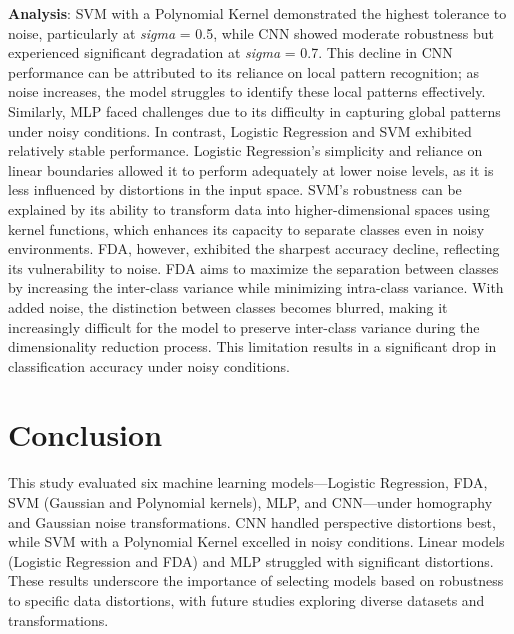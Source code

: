 \documentclass{article}
\begin{document}
\textbf{Analysis}:  
SVM with a Polynomial Kernel demonstrated the highest tolerance to noise, particularly at \textit{sigma} = 0.5, while CNN showed moderate robustness but experienced significant degradation at \textit{sigma} = 0.7. This decline in CNN performance can be attributed to its reliance on local pattern recognition; as noise increases, the model struggles to identify these local patterns effectively. Similarly, MLP faced challenges due to its difficulty in capturing global patterns under noisy conditions. 
In contrast, Logistic Regression and SVM exhibited relatively stable performance. Logistic Regression's simplicity and reliance on linear boundaries allowed it to perform adequately at lower noise levels, as it is less influenced by distortions in the input space. SVM's robustness can be explained by its ability to transform data into higher-dimensional spaces using kernel functions, which enhances its capacity to separate classes even in noisy environments.
FDA, however, exhibited the sharpest accuracy decline, reflecting its vulnerability to noise. FDA aims to maximize the separation between classes by increasing the inter-class variance while minimizing intra-class variance. With added noise, the distinction between classes becomes blurred, making it increasingly difficult for the model to preserve inter-class variance during the dimensionality reduction process. This limitation results in a significant drop in classification accuracy under noisy conditions.

\section{Conclusion}

This study evaluated six machine learning models—Logistic Regression, FDA, SVM (Gaussian and Polynomial kernels), MLP, and CNN—under homography and Gaussian noise transformations. 
CNN handled perspective distortions best, while SVM with a Polynomial Kernel excelled in noisy conditions. 
Linear models (Logistic Regression and FDA) and MLP struggled with significant distortions. These results underscore the importance of selecting models based on robustness to specific data distortions, 
with future studies exploring diverse datasets and transformations.
\end{document}
